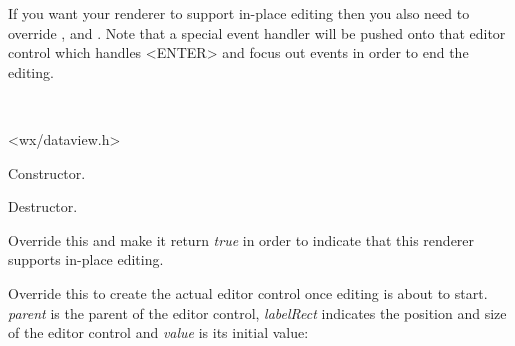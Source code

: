 If you want your renderer to support in-place editing then you
also need to override 
,
and .
Note that a special event handler will be pushed onto that
editor control which handles <ENTER> and focus out events
in order to end the editing.


\\


<wx/dataview.h>





\label{wxdataviewcustomrendererwxdataviewcustomrenderer}


Constructor.

\label{wxdataviewcustomrendererdtor}


Destructor.


\label{wxdataviewcustomrendererhaseditorctrl}


Override this and make it return {\it true} in order to
indicate that this renderer supports in-place editing.

\label{wxdataviewcustomrenderercreateeditorctrl}


Override this to create the actual editor control once editing
is about to start. {\it parent} is the parent of the editor
control, {\it labelRect} indicates the position and
size of the editor control and {\it value} is its initial value:

